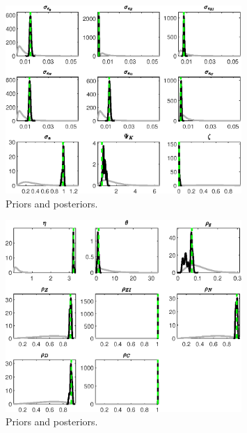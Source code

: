  
\begin{figure}[H]
\centering
\includegraphics[width=0.80\textwidth]{BRS_imp_mobility/Output/BRS_imp_mobility_PriorsAndPosteriors1}
\caption{Priors and posteriors.}\label{Fig:PriorsAndPosteriors:1}
\end{figure}
 
\begin{figure}[H]
\centering
\includegraphics[width=0.80\textwidth]{BRS_imp_mobility/Output/BRS_imp_mobility_PriorsAndPosteriors2}
\caption{Priors and posteriors.}\label{Fig:PriorsAndPosteriors:2}
\end{figure}
 

